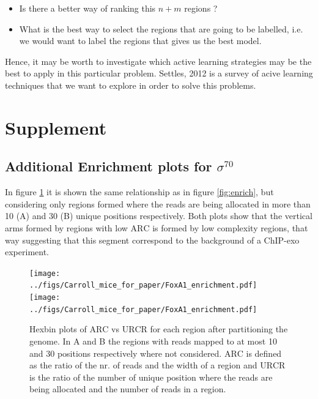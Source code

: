 \documentclass[11pt]{article}\usepackage[]{graphicx}\usepackage[]{color}
\begin{document}
\begin{itemize}
\item Is there a better way of ranking this $n+m$ regions ?
\item What is the best way to select the regions that are going to be
  labelled, i.e. we would want to label the regions that gives us the
  best model.
\end{itemize}

Hence, it may be worth to investigate which active learning strategies
may be the best to apply in this particular problem. Settles, 2012
\cite{al} is a survey of acive learning techniques that we want to
explore in order to solve this problems.



\newpage


\nocite{exo_gb}
\nocite{maplot1}
\nocite{maplot2}
\nocite{esl}
\nocite{anp}
\nocite{al}
\nocite{oc_review}
\nocite{exo4}

\section*{Supplement}
\label{sec:supp}


\subsection*{Additional Enrichment plots for $\sigma^{70}$}
\label{sec:enrichsup}

In figure \ref{fig:enrich2} it is shown the same relationship as in
figure \ref{fig:enrich}, but considering only regions formed where the
reads are being allocated in more than 10 (A) and 30 (B) unique
positions respectively. Both plots show that the vertical arms formed
by regions with low $\mbox{ARC}$ is formed by low complexity regions,
that way suggesting that this segment correspond to the background of
a ChIP-exo experiment.

\begin{figure}[h!]
  \centering
  \texttt{[image: ../figs/Carroll\_mice\_for\_paper/FoxA1\_enrichment.pdf]}
  \texttt{[image: ../figs/Carroll\_mice\_for\_paper/FoxA1\_enrichment.pdf]}
  \caption{Hexbin plots of $\mbox{ARC}$ vs $\mbox{URCR}$ for each
    region after partitioning the genome. In A and B the regions with
    reads mapped to at most 10 and 30 positions respectively where not
    considered. $\mbox{ARC}$ is defined as the ratio of the nr. of
    reads and the width of a region and $\mbox{URCR}$ is the ratio of
    the number of unique position where the reads are being allocated
    and the number of reads in a region.}
  \label{fig:enrich2}
\end{figure}
\end{document}
